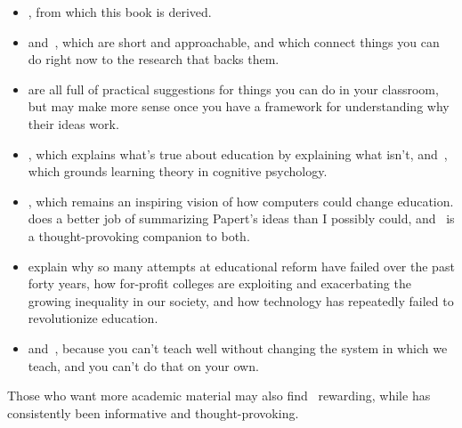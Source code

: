 \begin{itemize}

\item
  ,
  from which this book is derived.

\item
  \cite{Lang2016} and~\cite{Hust2012}, which are short and approachable,
  and which connect things you can do right now to the research that backs them.

\item
  \cite{Berg2012,Lemo2014,Majo2015,Broo2016,Rice2018,Wein2018b}
  are all full of practical suggestions for things you can do in your classroom,
  but may make more sense once you have a framework for understanding why their ideas work.

\item
  \cite{DeBr2015},
  which explains what's true about education by explaining what isn't,
  and~\cite{Dida2016},
  which grounds learning theory in cognitive psychology.

\item
  \cite{Pape1993},
  which remains an inspiring vision of how computers could change education.
  does a better job of summarizing Papert's ideas than I possibly could,
  and~\cite{Craw2010} is a thought-provoking companion to both.

\item
  \cite{Gree2014,McMi2017,Watt2014} explain why so many attempts at educational reform have failed over the past forty years,
  how for-profit colleges are exploiting and exacerbating the growing inequality in our society,
  and how technology has repeatedly failed to revolutionize education.

\item
  \cite{Brow2007} and~\cite{Mann2015},
  because you can't teach well without changing the system in which we teach,
  and you can't do that on your own.

\end{itemize}

Those who want more academic material may also find~\cite{Guzd2015a,Hazz2014,Sent2018,Finc2019,Hpl2018} rewarding,
while  has consistently been informative and thought-provoking.

